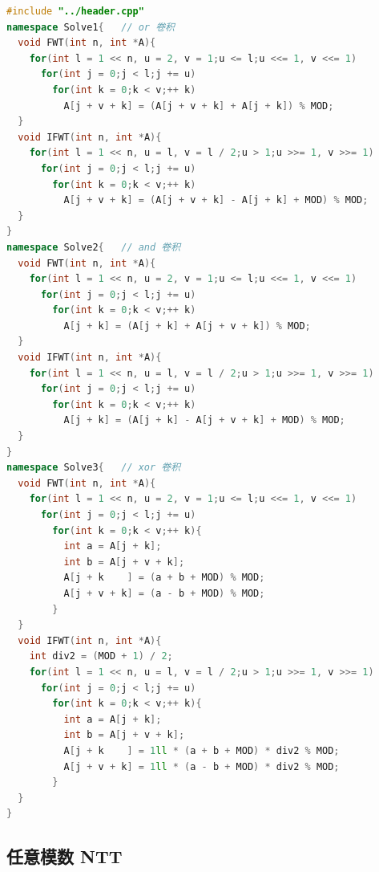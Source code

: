 \documentclass[10pt]{ctexart}
\begin{document}
\begin{multicols}{3}
\begin{lstlisting}[language={C++}]
#include "../header.cpp"
namespace Solve1{   // or 卷积
  void FWT(int n, int *A){
    for(int l = 1 << n, u = 2, v = 1;u <= l;u <<= 1, v <<= 1)
      for(int j = 0;j < l;j += u)
        for(int k = 0;k < v;++ k)
          A[j + v + k] = (A[j + v + k] + A[j + k]) % MOD;
  }
  void IFWT(int n, int *A){
    for(int l = 1 << n, u = l, v = l / 2;u > 1;u >>= 1, v >>= 1)
      for(int j = 0;j < l;j += u)
        for(int k = 0;k < v;++ k)
          A[j + v + k] = (A[j + v + k] - A[j + k] + MOD) % MOD;
  }
}
namespace Solve2{   // and 卷积
  void FWT(int n, int *A){
    for(int l = 1 << n, u = 2, v = 1;u <= l;u <<= 1, v <<= 1)
      for(int j = 0;j < l;j += u)
        for(int k = 0;k < v;++ k)
          A[j + k] = (A[j + k] + A[j + v + k]) % MOD;
  }
  void IFWT(int n, int *A){
    for(int l = 1 << n, u = l, v = l / 2;u > 1;u >>= 1, v >>= 1)
      for(int j = 0;j < l;j += u)
        for(int k = 0;k < v;++ k)
          A[j + k] = (A[j + k] - A[j + v + k] + MOD) % MOD;
  }
}
namespace Solve3{   // xor 卷积
  void FWT(int n, int *A){
    for(int l = 1 << n, u = 2, v = 1;u <= l;u <<= 1, v <<= 1)
      for(int j = 0;j < l;j += u)
        for(int k = 0;k < v;++ k){
          int a = A[j + k];
          int b = A[j + v + k];
          A[j + k    ] = (a + b + MOD) % MOD;
          A[j + v + k] = (a - b + MOD) % MOD;
        }
  }
  void IFWT(int n, int *A){
    int div2 = (MOD + 1) / 2;
    for(int l = 1 << n, u = l, v = l / 2;u > 1;u >>= 1, v >>= 1)
      for(int j = 0;j < l;j += u)
        for(int k = 0;k < v;++ k){
          int a = A[j + k];
          int b = A[j + v + k];
          A[j + k    ] = 1ll * (a + b + MOD) * div2 % MOD;
          A[j + v + k] = 1ll * (a - b + MOD) * div2 % MOD;
        }
  }
}
\end{lstlisting}

    \subsection{任意模数 NTT}\label{ux4efbux610fux6a21ux6570-ntt}


\end{multicols}
\end{document}
